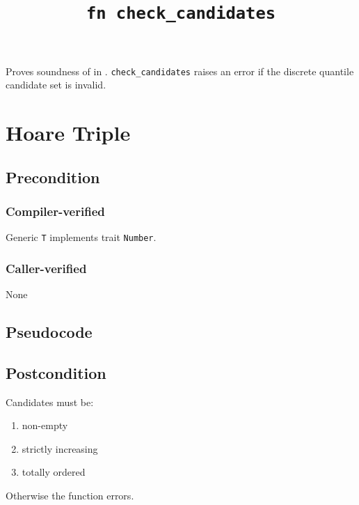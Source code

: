 \documentclass{article}
\title{\texttt{fn check\_candidates}}
\author{\MichaelShoemateAuthor}
\begin{document}
\maketitle


\contrib

Proves soundness of 
in .
\texttt{check\_candidates} raises an error if the discrete quantile candidate set is invalid.

\section{Hoare Triple}
\subsection*{Precondition}
\subsubsection*{Compiler-verified}
Generic \texttt{T} implements trait \texttt{Number}.

\subsubsection*{Caller-verified}
None

\subsection*{Pseudocode}
\label{sec:python-pseudocode}


\subsection*{Postcondition}

\begin{theorem}
    Candidates must be:
    \begin{enumerate}
        \item non-empty
        \item strictly increasing
        \item totally ordered
    \end{enumerate}

    Otherwise the function errors.
\end{theorem}
\end{document}
